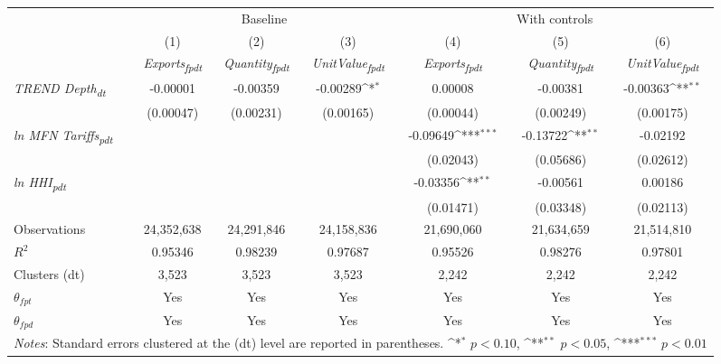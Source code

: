 {
\def\sym#1{\ifmmode^{#1}\else\(^{#1}\)\fi}
\begin{tabular}{l*{6}{c}}
\toprule
&\multicolumn{3}{c}{Baseline}&\multicolumn{3}{c}{With controls}\\\cmidrule(lr){2-4}\cmidrule(lr){5-7}
&(1)&(2)&(3)&(4)&(5)&(6)\\
&\textit{Exports\textsubscript{fpdt}}&\textit{Quantity\textsubscript{fpdt}}&\textit{UnitValue\textsubscript{fpdt}}&\textit{Exports\textsubscript{fpdt}}&\textit{Quantity\textsubscript{fpdt}}&\textit{UnitValue\textsubscript{fpdt}}\\
\midrule
\textit{TREND Depth\textsubscript{dt}} & -0.00001 & -0.00359 & -0.00289\sym{*} & 0.00008 & -0.00381 & -0.00363\sym{**}\\
 & (0.00047) & (0.00231) & (0.00165) & (0.00044) & (0.00249) & (0.00175)\\
\addlinespace
\textit{ln MFN Tariffs\textsubscript{pdt}} &  &  &  & -0.09649\sym{***} & -0.13722\sym{**} & -0.02192\\
 &  &  &  & (0.02043) & (0.05686) & (0.02612)\\
\addlinespace
\textit{ln HHI\textsubscript{pdt}} &  &  &  & -0.03356\sym{**} & -0.00561 & 0.00186\\
 &  &  &  & (0.01471) & (0.03348) & (0.02113)\\
\midrule
Observations & 24,352,638 & 24,291,846 & 24,158,836 & 21,690,060 & 21,634,659 & 21,514,810\\
$R^{2}$ & 0.95346 & 0.98239 & 0.97687 & 0.95526 & 0.98276 & 0.97801\\
Clusters (dt) & 3,523 & 3,523 & 3,523 & 2,242 & 2,242 & 2,242\\
$\theta_{fpt}$ & Yes & Yes & Yes & Yes & Yes & Yes\\
$\theta_{fpd}$ & Yes & Yes & Yes & Yes & Yes & Yes\\
\bottomrule
\multicolumn{7}{l}{\footnotesize \textit{Notes}: Standard errors clustered at the (dt) level are reported in parentheses. \sym{*} \(p<0.10\), \sym{**} \(p<0.05\), \sym{***} \(p<0.01\)}\\
\end{tabular}
}
